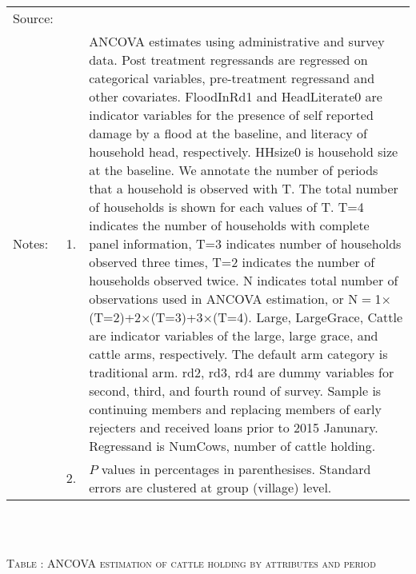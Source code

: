 \begin{minipage}[t]{14cm}
\begin{tikzpicture}
%
\end{tikzpicture}\\
\renewcommand{\arraystretch}{.8}
\setlength{\tabcolsep}{1pt} \begin{tabular}{>{\hfill\scriptsize}p{1cm}<{}>{\hfill\scriptsize}p{.25cm}<{}>{\scriptsize}p{12cm}<{\hfill}} 
Source:& \multicolumn{2}{l}{\scriptsize Estimated with GUK administrative and survey data.}\\
Notes: & 1. & ANCOVA estimates using administrative and survey data. Post treatment regressands are regressed on categorical variables, pre-treatment regressand and other covariates. \textsf{FloodInRd1} and \textsf{HeadLiterate0} are indicator variables for the presence of self reported damage by a flood at the baseline, and literacy of household head, respectively. \textsf{HHsize0} is household size at the baseline. We annotate the number of periods that a household is observed with \textsf{T}. The total number of households is shown for each values of \textsf{T}. \textsf{T=4} indicates the number of households with complete panel information, \textsf{T=3} indicates number of households observed three times, \textsf{T=2} indicates the number of households observed twice. \textsf{N} indicates total number of observations used in ANCOVA estimation, or \textsf{N$=$1$\times$(T=2)+2$\times$(T=3)+3$\times$(T=4)}.  \textsf{Large}, \textsf{LargeGrace}, \textsf{Cattle} are indicator variables of the \textsf{large}, \textsf{large grace}, and \textsf{cattle} arms, respectively. The default arm category is \textsf{traditional} arm. \textsf{rd2, rd3, rd4} are dummy variables for second, third, and fourth round of survey. Sample is continuing members and replacing members of early rejecters and received loans prior to 2015 Janunary. Regressand is \textsf{NumCows}, number of cattle holding. \\
& 2. & $P$ values in percentages in parenthesises. Standard errors are clustered at group (village) level. %
 \end{tabular}
\end{minipage} \\\\\hspace{-1cm}\begin{minipage}[t]{14cm} \hfil\textsc{\normalsize Table \thetable: ANCOVA estimation of cattle holding by attributes and period\label{tab ANCOVA cow time varying attributes}}\\ \setlength{\tabcolsep}{1pt}

\end{minipage}
